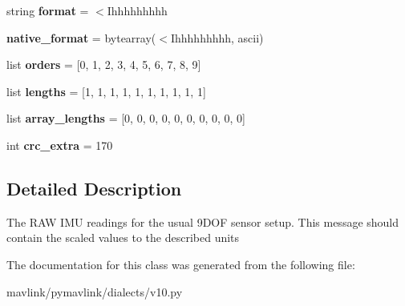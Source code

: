 \begin{DoxyCompactItemize}
\mbox{\label{classpymavlink_1_1dialects_1_1v10_1_1MAVLink__scaled__imu__message_ad0ced16aec03e9d06206446346abd913}} 
string {\bfseries format} = \textquotesingle{}$<$Ihhhhhhhhh\textquotesingle{}
\item 
\mbox{\label{classpymavlink_1_1dialects_1_1v10_1_1MAVLink__scaled__imu__message_a46a99ae3725caee9ec6bb8a92799597f}} 
{\bfseries native\+\_\+format} = bytearray(\textquotesingle{}$<$Ihhhhhhhhh\textquotesingle{}, \textquotesingle{}ascii\textquotesingle{})
\item 
\mbox{\label{classpymavlink_1_1dialects_1_1v10_1_1MAVLink__scaled__imu__message_a5429de5823551ec923e2def25a29e853}} 
list {\bfseries orders} = \mbox{[}0, 1, 2, 3, 4, 5, 6, 7, 8, 9\mbox{]}
\item 
\mbox{\label{classpymavlink_1_1dialects_1_1v10_1_1MAVLink__scaled__imu__message_a16e439a48185082b418c90e6526f9ce8}} 
list {\bfseries lengths} = \mbox{[}1, 1, 1, 1, 1, 1, 1, 1, 1, 1\mbox{]}
\item 
\mbox{\label{classpymavlink_1_1dialects_1_1v10_1_1MAVLink__scaled__imu__message_ab352e941ec20890277d6e71088463cbc}} 
list {\bfseries array\+\_\+lengths} = \mbox{[}0, 0, 0, 0, 0, 0, 0, 0, 0, 0\mbox{]}
\item 
\mbox{\label{classpymavlink_1_1dialects_1_1v10_1_1MAVLink__scaled__imu__message_ab7b268a46b292a9b2b368361a9bb227c}} 
int {\bfseries crc\+\_\+extra} = 170
\end{DoxyCompactItemize}


\subsection{Detailed Description}
\begin{DoxyVerb}The RAW IMU readings for the usual 9DOF sensor setup. This
message should contain the scaled values to the described
units
\end{DoxyVerb}
 

The documentation for this class was generated from the following file\+:\begin{DoxyCompactItemize}
\item 
mavlink/pymavlink/dialects/v10.\+py\end{DoxyCompactItemize}
